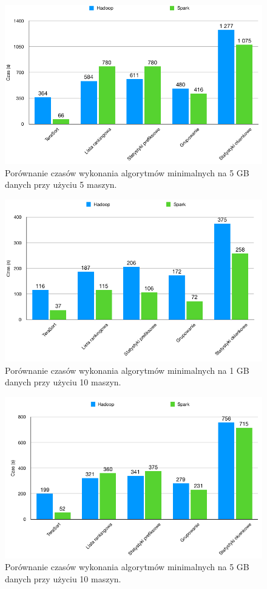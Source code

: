 \documentclass[magisterska]{pracamgr}
\begin{document}
\begin{figure}[H]
\centering
  \caption{Porównanie czasów wykonania algorytmów minimalnych na 5 GB danych przy użyciu 5 maszyn.}
  \includegraphics[width=13cm]{5_5_execution.png}
\end{figure}

\begin{figure}[H]
\centering
  \caption{Porównanie czasów wykonania algorytmów minimalnych na 1 GB danych przy użyciu 10 maszyn.}
  \includegraphics[width=13cm]{1_10_execution.png}
\end{figure}

\begin{figure}[H]
\centering
  \caption{Porównanie czasów wykonania algorytmów minimalnych na 5 GB danych przy użyciu 10 maszyn.}
  \includegraphics[width=13cm]{5_10_execution.png}
\end{figure}
\end{document}
